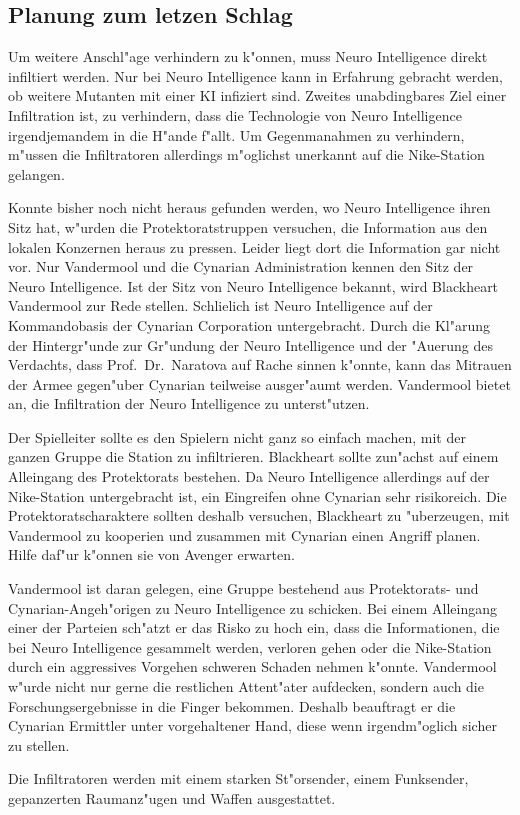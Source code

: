 \subsection{Planung zum letzen Schlag}

Um weitere Anschl"age verhindern zu k"onnen, muss Neuro Intelligence direkt infiltiert werden. Nur bei Neuro Intelligence kann in Erfahrung gebracht werden, ob weitere Mutanten mit einer KI infiziert sind. Zweites unabdingbares Ziel einer Infiltration ist, zu verhindern, dass die Technologie von Neuro Intelligence irgendjemandem in die H"ande f"allt. Um Gegenma\3nahmen zu verhindern, m"ussen die Infiltratoren allerdings m"oglichst unerkannt auf die Nike-Station gelangen.

Konnte bisher noch nicht heraus gefunden werden, wo Neuro Intelligence ihren Sitz hat, w"urden die Protektoratstruppen versuchen, die Information aus den lokalen Konzernen heraus zu pressen. Leider liegt dort die Information gar nicht vor. Nur Vandermool und die Cynarian Administration kennen den Sitz der Neuro Intelligence. Ist der Sitz von Neuro Intelligence bekannt, wird Blackheart Vandermool zur Rede stellen. Schlie\3lich ist Neuro Intelligence auf der Kommandobasis der Cynarian Corporation untergebracht. Durch die Kl"arung der Hintergr"unde zur Gr"undung der Neuro Intelligence und der "Au\3erung des Verdachts, dass Prof.~Dr.~Naratova auf Rache sinnen k"onnte, kann das Mi\3trauen der Armee gegen"uber Cynarian teilweise ausger"aumt werden. Vandermool bietet an, die Infiltration der Neuro Intelligence zu unterst"utzen.

\begin{remarks}
	Der Spielleiter sollte es den Spielern nicht ganz so einfach machen, mit der ganzen Gruppe die Station zu infiltrieren. Blackheart sollte zun"achst auf einem Alleingang des Protektorats bestehen. Da Neuro Intelligence allerdings auf der Nike-Station untergebracht ist, ein Eingreifen ohne Cynarian sehr risikoreich. Die Protektoratscharaktere sollten deshalb versuchen, Blackheart zu "uberzeugen, mit Vandermool zu kooperien und zusammen mit Cynarian einen Angriff planen. Hilfe daf"ur k"onnen sie von Avenger erwarten.
	
	Vandermool ist daran gelegen, eine Gruppe bestehend aus Protektorats- und Cynarian-Angeh"origen zu Neuro Intelligence zu schicken. Bei einem Alleingang einer der Parteien sch"atzt er das Risko zu hoch ein, dass die Informationen, die bei Neuro Intelligence gesammelt werden, verloren gehen oder die Nike-Station durch ein aggressives Vorgehen schweren Schaden nehmen k"onnte. Vandermool w"urde nicht nur gerne die restlichen Attent"ater aufdecken, sondern auch die Forschungsergebnisse in die Finger bekommen. Deshalb beauftragt er die Cynarian Ermittler unter vorgehaltener Hand, diese wenn irgendm"oglich sicher zu stellen.
	
	Die Infiltratoren werden mit einem starken St"orsender, einem Funksender, gepanzerten Raumanz"ugen und Waffen ausgestattet.
\end{remarks}

